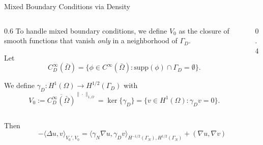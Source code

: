 \documentclass[aspectratio=169]{beamer}
\begin{document}
\begin{frame}{Mixed Boundary Conditions via Density}
    \begin{columns}
        \begin{column}{0.6\textwidth}
            To handle mixed boundary conditions, we define $V_0$ as the closure of smooth functions that vanish \textit{only} in a neighborhood of $\Gamma_D$.

            \vspace{0.2cm}
            Let 
            $$C^\infty_D(\bar{\Omega}) = \{ \phi \in C^\infty(\bar{\Omega}) : \text{supp}(\phi) \cap \Gamma_D = \emptyset \}.$$

            We define $\gamma_D: H^1(\Omega)\to H^{1/2}(\Gamma_D)$ with 
            $$ V_0 := \overline{C^\infty_D(\bar{\Omega})}^{\|\cdot\|_{1,\Omega}} = \ker \{\gamma_D\} = \{v \in H^1(\Omega): \gamma_D v = 0 \}. $$

            \vspace{0.2cm}
        \end{column}
        \begin{column}{0.4\textwidth}
            \begin{center}
            \end{center}
        \end{column}
    \end{columns}

    \vspace{1cm}
        Then
            $$ -\langle \Delta u, v\rangle_{V_0', V_0} = \langle \gamma_N \nabla u, \gamma_D v\rangle_{H^{-1/2}(\Gamma_N), H^{1/2}(\Gamma_N)} + (\nabla u, \nabla v) $$ 
\end{frame}
\end{document}
